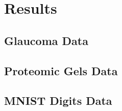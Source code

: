\section{Results}\label{sec:results}

\subsection{Glaucoma Data}
\subsection{Proteomic Gels Data}
\subsection{MNIST Digits Data}